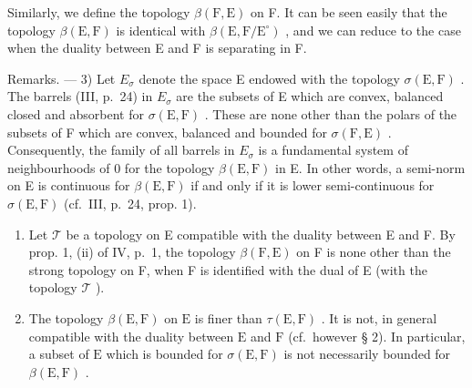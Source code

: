 Similarly, we define the topology \(\beta(\mathrm{F},\mathrm{E})\) on F. It can be seen easily that the topology \(\beta(\mathrm{E},\mathrm{F})\) is identical with \(\beta(\mathrm{E},\mathrm{F}/\mathrm{E}^{\circ})\) , and we can reduce to the case when the duality between E and F is separating in F.

Remarks. --- 3) Let \(E_{\sigma}\) denote the space E endowed with the topology \(\sigma(\mathrm{E}, \mathrm{F})\) . The barrels (III, p.~24) in \(E_{\sigma}\) are the subsets of E which are convex, balanced closed and absorbent for \(\sigma(\mathrm{E}, \mathrm{F})\) . These are none other than the polars of the subsets of F which are convex, balanced and bounded for \(\sigma(\mathrm{F}, \mathrm{E})\) . Consequently, the family of all barrels in \(E_{\sigma}\) is a fundamental system of neighbourhoods of 0 for the topology \(\beta(\mathrm{E}, \mathrm{F})\) in E. In other words, a semi-norm on E is continuous for \(\beta(\mathrm{E}, \mathrm{F})\) if and only if it is lower semi-continuous for \(\sigma(\mathrm{E}, \mathrm{F})\) (cf.~III, p.~24, prop. 1).

\begin{enumerate}
\def\labelenumi{\arabic{enumi})}
\setcounter{enumi}{3}
\item
  Let \(\mathcal{T}\) be a topology on E compatible with the duality between E and F. By prop. 1, (ii) of IV, p.~1, the topology \(\beta(\mathrm{F},\mathrm{E})\) on F is none other than the strong topology on F, when F is identified with the dual of E (with the topology \(\mathcal{T}\) ).
\item
  The topology \(\beta(\mathrm{E},\mathrm{F})\) on \(\mathrm{E}\) is finer than \(\tau(\mathrm{E},\mathrm{F})\) . It is not, in general compatible with the duality between \(\mathrm{E}\) and \(\mathrm{F}\) (cf.~however § 2). In particular, a subset of \(\mathrm{E}\) which is bounded for \(\sigma(\mathrm{E},\mathrm{F})\) is not necessarily bounded for \(\beta(\mathrm{E},\mathrm{F})\) .
\end{enumerate}
